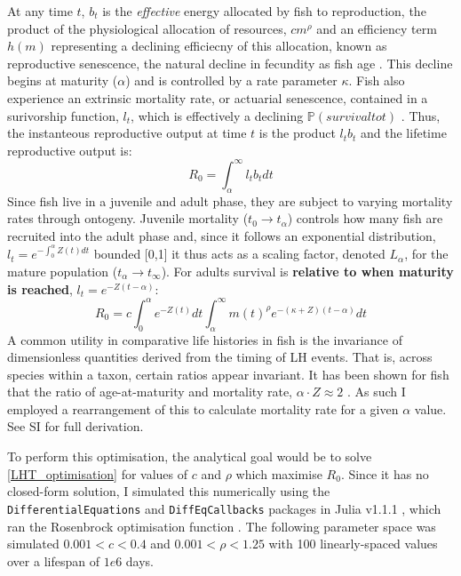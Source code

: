 \documentclass[a4paper]{article} %
\begin{document}
At any time $t$, $b_{t}$ is the \textit{effective} energy allocated by fish to reproduction, the product of the physiological allocation of resources, $cm^{\rho}$ and an efficiency term $h(m)$ representing a declining efficiecny of this allocation, known as reproductive senescence, the natural decline in fecundity as fish age \autocite{Stearns2000, Benoit2018, Vrtilek2018}. This decline begins at maturity ($\alpha$) and is controlled by a rate parameter $\kappa$. Fish also experience an extrinsic mortality rate, or actuarial senescence, contained in a surivorship function, $l_t$, which is effectively a declining $\mathbb{P}(survival to t)$ \autocite{Charnov1993, Charnov2001, Benoit2018, Laird2010, Reznick2002, Reznick2006}. Thus, the instanteous reproductive output at time $t$ is the product $l_{t}b_{t}$ and the lifetime reproductive output is:
\begin{equation}
    R_{0} = \int_{\alpha}^{\infty}l_{t}b_{t} dt
\end{equation}
Since fish live in a juvenile and adult phase, they are subject to varying mortality rates through ontogeny. Juvenile mortality ($t_0 \rightarrow t_{\alpha}$) controls how many fish are recruited into the adult phase and, since it follows an exponential distribution, $l_t = e^{-\int_{0}^{\alpha}Z(t)dt}$ bounded [0,1] it thus acts as a scaling factor, denoted $L_{\alpha}$, for the mature population ($t_{\alpha} \rightarrow t_{\infty}$). For adults survival is \textbf{relative to when maturity is reached}, $l_{t} = e^{-Z(t-\alpha)}$:
\begin{equation}
    R_{0} = c\int_{0}^{\alpha}e^{-Z(t)}dt\int_{\alpha}^{\infty} m(t)^{\rho} e^{-(\kappa+Z)(t-\alpha)} dt \label{LHT_optimisation}
\end{equation}
A common utility in comparative life histories in fish is the invariance of dimensionless quantities derived from the timing of LH events. That is, across species within a taxon, certain ratios appear invariant. It has been shown for fish that the ratio of age-at-maturity and mortality rate, $\alpha\cdot Z \approx 2$ \autocite{Charnov1993}. As such I employed a rearrangement of this to calculate mortality rate for a given $\alpha$ value.
See SI for full derivation.

To perform this optimisation, the analytical goal would be to solve \eqref{LHT_optimisation} for values of $c$ and $\rho$ which maximise $R_0$. Since it has no closed-form solution, I simulated this numerically using the \texttt{DifferentialEquations} and \texttt{DiffEqCallbacks} packages in Julia v1.1.1 \autocite{Bezanson2017}, which ran the Rosenbrock optimisation function \autocite{Rosenbrock1960}. The following parameter space was simulated $0.001 < c < 0.4$ and $0.001 < \rho < 1.25$ with 100 linearly-spaced values over a lifespan of $1e6$ days.
\end{document}
